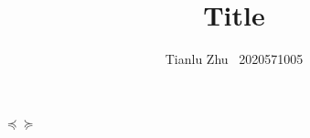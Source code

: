 \documentclass[en,hazy,blue,12pt,device = pad]{elegantnote}
\title{Title}
\author{Tianlu Zhu \ 2020571005}
\date{}
\begin{document}
\maketitle

\(\preceq\succeq \)
\end{document}
